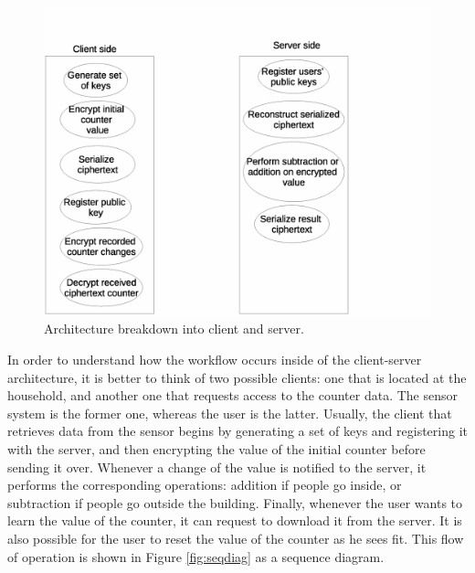 \begin{figure}[H]
  \centering 
  \includegraphics[scale=0.5]{clientserver}
  \caption{Architecture breakdown into client and server.}
  \label{fig:clientserver}
\end{figure}


In order to understand how the workflow occurs inside of the client-server architecture, it is better to think of two possible clients: one that is located at the household, and another one that requests access to the counter data. The sensor system is the former one, whereas the user is the latter. Usually, the client that retrieves data from the sensor begins by generating a set of keys and registering it with the server, and then encrypting the value of the initial counter before sending it over. Whenever a change of the value is notified to the server, it performs the corresponding operations: addition if people go inside, or subtraction if people go outside the building. Finally, whenever the user wants to learn the value of the counter, it can request to download it from the server. It is also possible for the user to reset the value of the counter as he sees fit. This flow of operation is shown in Figure \ref{fig:seqdiag} as a sequence diagram.

